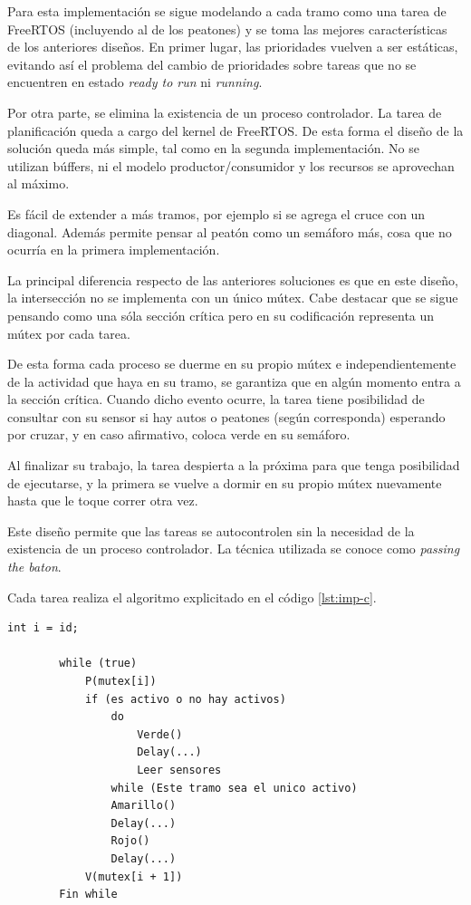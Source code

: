 	Para esta implementación se sigue modelando a cada tramo como una tarea de FreeRTOS (incluyendo al de los peatones) y se toma las mejores características de los anteriores diseños.
	En primer lugar, las prioridades vuelven a ser estáticas, evitando así el problema del cambio de prioridades sobre tareas que no se encuentren en estado \emph{ready to run} ni \emph{running}.

	Por otra parte, se elimina la existencia de un proceso controlador.
	La tarea de planificación queda a cargo del kernel de FreeRTOS.
	De esta forma el diseño de la solución queda más simple, tal como en la segunda implementación.
	No se utilizan búffers, ni el modelo productor/consumidor y los recursos se aprovechan al máximo.

	Es fácil de extender a más tramos, por ejemplo si se agrega el cruce con un diagonal.
	Además permite pensar al peatón como un semáforo más, cosa que no ocurría en la primera implementación.

	La principal diferencia respecto de las anteriores soluciones es que en este diseño, la intersección no se implementa con un único mútex.
	Cabe destacar que se sigue pensando como una sóla sección crítica pero en su codificación representa un mútex por cada tarea.

	De esta forma cada proceso se duerme en su propio mútex e independientemente de la actividad que haya en su tramo, se garantiza que en algún momento entra a la sección crítica.
	Cuando dicho evento ocurre, la tarea tiene posibilidad de consultar con su sensor si hay autos o peatones (según corresponda) esperando por cruzar, y en caso afirmativo, coloca verde en su semáforo.

	Al finalizar su trabajo, la tarea despierta a la próxima para que tenga posibilidad de ejecutarse, y la primera se vuelve a dormir en su propio mútex nuevamente hasta que le toque correr otra vez.

	Este diseño permite que las tareas se autocontrolen sin la necesidad de la existencia de un proceso controlador.
	La técnica utilizada se conoce como \emph{passing the baton}.

	Cada tarea realiza el algoritmo explicitado en el código \ref{lst:imp-c}.

	\begin{lstlisting}[float, label=lst:imp-c, caption=Pseudocódigo del programa que corre cada tarea en la implementación C.]
		int i = id;

		while (true)
			P(mutex[i])
			if (es activo o no hay activos)
				do
					Verde()
					Delay(...)
					Leer sensores
				while (Este tramo sea el unico activo)
				Amarillo()
				Delay(...)
				Rojo()
				Delay(...)
			V(mutex[i + 1])
		Fin while
	\end{lstlisting}

